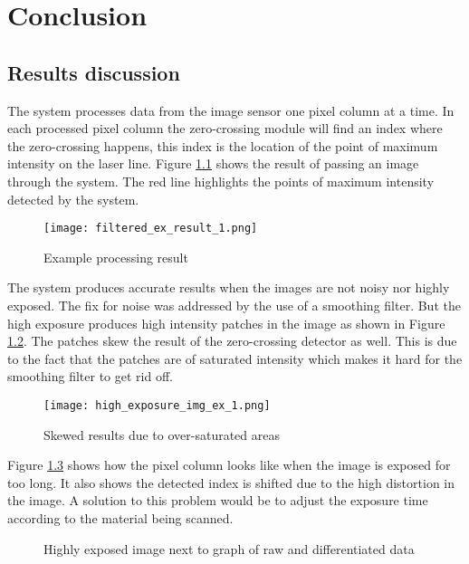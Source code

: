 \chapter{Conclusion}

\section{Results discussion}

The system processes data from the image sensor one pixel column at a time. In each processed pixel column the zero-crossing module will find an index where the zero-crossing happens, this index is the location of the point of maximum intensity on the laser line. Figure \ref{fig:filtered_ex_result_1} shows the result of passing an image through the system. The red line highlights the points of maximum intensity detected by the system.


\begin{figure}[h]
    \centering
    \texttt{[image: filtered\_ex\_result\_1.png]}
    \caption{Example processing result}
    \label{fig:filtered_ex_result_1}
\end{figure}


The system produces accurate results when the images are not noisy nor highly exposed. The fix for noise was addressed by the use of a smoothing filter. But the high exposure produces high intensity patches in the image as shown in Figure \ref{fig:high_exposure_img_ex_1}. The patches skew the result of the zero-crossing detector as well. This is due to the fact that the patches are of saturated intensity which makes it hard for the smoothing filter to get rid off.


\begin{figure}[h]
    \centering
    \texttt{[image: high\_exposure\_img\_ex\_1.png]}
    \caption{Skewed results due to over-saturated areas}
    \label{fig:high_exposure_img_ex_1}
\end{figure}


Figure \ref{fig:high_exposure_img_ex_2} shows how the pixel column looks like when the image is exposed for too long. It also shows the detected index is shifted due to the high distortion in the image. A solution to this problem would be to adjust the exposure time according to the material being scanned.


\begin{figure}[h]
    \centering
    
    \caption{Highly exposed image next to graph of raw and differentiated data}
    \label{fig:high_exposure_img_ex_2}
\end{figure}




